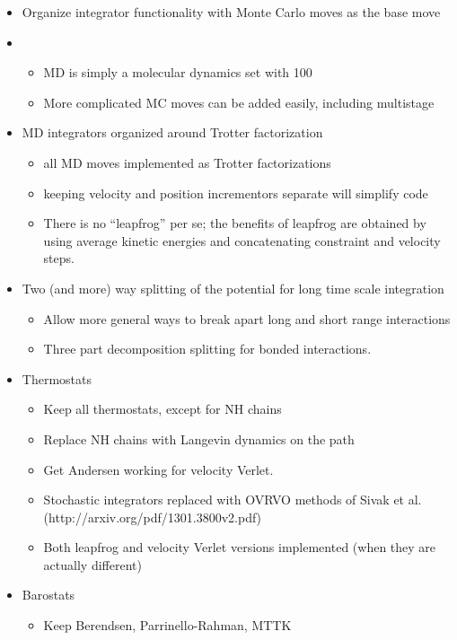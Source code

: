\documentclass[11pt,a4paper,twoside]{article}
\begin{document}
\begin{itemize}
\item Organize integrator functionality with Monte Carlo moves as the base move
\item 
   \begin{itemize}
   \item MD is simply a molecular dynamics set with 100%
   \item More complicated MC moves can be added easily, including multistage
   \end{itemize}
\item MD integrators organized around Trotter factorization
  \begin{itemize}
  \item all MD moves implemented as Trotter factorizations
  \item keeping velocity and position incrementors separate will simplify code
  \item There is no ``leapfrog'' per se; the benefits of leapfrog are
    obtained by using average kinetic energies and concatenating
    constraint and velocity steps.
\end{itemize}
\item Two (and more) way splitting of the potential for long time scale integration
    \begin{itemize} 
      \item Allow more general ways to break apart long and short range interactions 
      \item Three part decomposition splitting for bonded interactions.
    \end{itemize}
\item Thermostats
  \begin{itemize} 
      \item Keep all thermostats, except for NH chains
      \item Replace NH chains with Langevin dynamics on the path
      \item Get Andersen working for velocity Verlet.
      \item Stochastic integrators replaced with OVRVO methods of
        Sivak et al. (http://arxiv.org/pdf/1301.3800v2.pdf)
      \item Both leapfrog and velocity Verlet versions implemented (when they are actually different)
  \end{itemize}
\item Barostats 
  \begin{itemize}
     \item Keep Berendsen, Parrinello-Rahman, MTTK 

\end{itemize}
\end{itemize}
\end{document}
